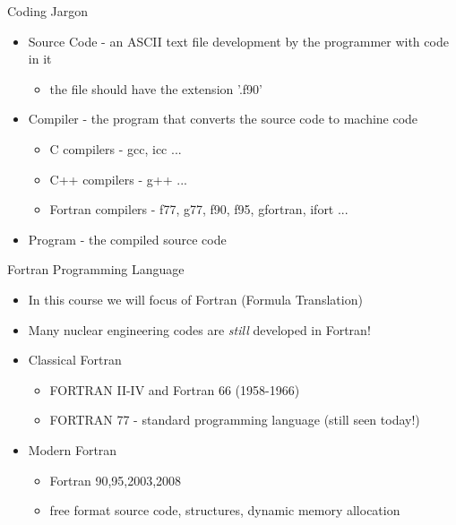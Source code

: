 \documentclass{beamer}
\begin{document}
\begin{frame}{Coding Jargon}

\begin{itemize} 

  \item Source Code - an ASCII text file development by the programmer with code in it
  \begin{itemize}
   \item the file should have the extension '.f90'
  \end{itemize}
  \vfill\item Compiler - the program that converts the source code to machine code
  \begin{itemize}
   \item C compilers - gcc, icc ...
   \item C++ compilers - g++ ...
   \item Fortran compilers - f77, g77, f90, f95, gfortran, ifort ...
  \end{itemize}
  \vfill\item Program - the compiled source code

\end{itemize}
\end{frame}
\begin{frame}{Fortran Programming Language}

  \begin{itemize}
    \item In this course we will focus of Fortran (Formula Translation)
    \item Many nuclear engineering codes are \emph{still} developed in Fortran!

    \vfill\item Classical Fortran
      \begin{itemize}
	\item FORTRAN II-IV and Fortran 66 (1958-1966)
	\item FORTRAN 77 - standard programming language (still seen today!)
      \end{itemize}

    \vfill\item \alert{Modern Fortran}
    \begin{itemize}
      \item Fortran 90,95,2003,2008
      \item free format source code, structures, dynamic memory allocation
    \end{itemize}

  \end{itemize}
\end{frame}
\end{document}
